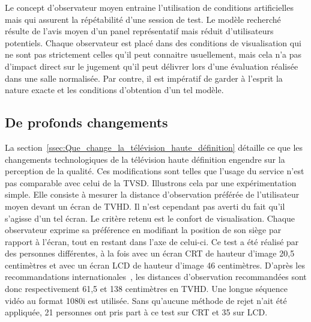 Le concept d'observateur moyen entraine l'utilisation de conditions artificielles mais qui assurent la répétabilité d'une session de test. Le modèle recherché résulte de l'avis moyen d'un panel représentatif mais réduit d'utilisateurs potentiels. Chaque observateur est placé dans des conditions de visualisation qui ne sont pas strictement celles qu'il peut connaitre usuellement, mais cela n'a pas d'impact direct sur le jugement qu'il peut délivrer lors d'une évaluation réalisée dans une salle normalisée. Par contre, il est impératif de garder à l'esprit la nature exacte et les conditions d'obtention d'un tel modèle.


\subsection{De profonds changements}
La section~\ref{ssec:Que_change_la_télévision_haute_définition} détaille ce que les changements technologiques de la télévision haute définition engendre sur la perception de la qualité. Ces modifications sont telles que l'usage du service n'est pas comparable avec celui de la TVSD. Illustrons cela par une expérimentation simple. Elle consiste à mesurer la distance d'observation préférée de l'utilisateur moyen devant un écran de TVHD. Il n'est cependant pas averti du fait qu'il s'agisse d'un tel écran. Le critère retenu est le confort de visualisation. Chaque observateur exprime sa préférence en modifiant la position de son siège par rapport à l'écran, tout en restant dans l'axe de celui-ci. Ce test a été réalisé par des personnes différentes, à la fois avec un écran CRT de hauteur d'image 20,5 centimètres et avec un écran LCD de hauteur d'image 46 centimètres. D'après les recommandations internationales~\cite{itu-bt500-11}, les distances d'observation recommandées sont donc respectivement 61,5 et 138 centimètres en TVHD. Une longue séquence vidéo au format 1080i est utilisée. Sans qu'aucune méthode de rejet n'ait été appliquée, 21 personnes ont pris part à ce test sur CRT et 35 sur LCD. %

